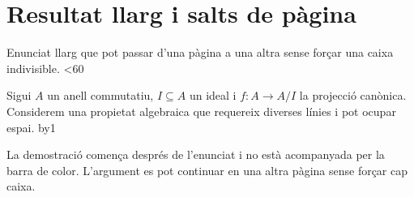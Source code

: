 \documentclass[a4paper,11pt]{article}
\begin{document}
\section{Resultat llarg i salts de pàgina}
\begin{teo}
Enunciat llarg que pot passar d'una pàgina a una altra sense
forçar una caixa indivisible.
\newcount\comptador
{}
\loop\ifnum\comptador<60
\par Sigui $A$ un anell commutatiu, $I\subseteq A$ un ideal i
$f:A\to A/I$ la projecció canònica. Considerem una propietat
algebraica que requereix diverses línies i pot ocupar espai.
\advance\comptador by1
\repeat
\begin{dem}
La demostració comença després de l'enunciat i no està
acompanyada per la barra de color. L'argument es pot continuar
en una altra pàgina sense forçar cap caixa.
\end{dem}
\end{teo}
\end{document}
